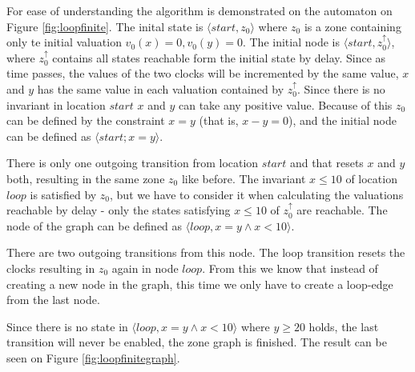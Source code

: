 \begin{example}
	


For ease of understanding the algorithm is demonstrated on the automaton on Figure \ref{fig:loopfinite}. The inital state is  $\langle start, z_0 \rangle$ where $z_0$ is a zone containing only te initial valuation $v_0(x)=0, v_0(y)=0$. The initial node is  $\langle start, z_0^\uparrow  \rangle$, where $z_0^\uparrow$ contains all states reachable form the initial state by delay. Since as time passes, the values of the two clocks will be incremented by the same value, $x$ and $y$ has the same value in each valuation contained by $z_0^\uparrow$. Since there is no invariant in location $start$ $x$ and $y$ can take any positive value. Because of this $z_0$ can be defined by the constraint $x=y$ (that is, $x-y = 0$), and the initial node can be defined as $\langle start; x=y  \rangle$.

There is only one outgoing transition from location $start$ and that resets $x$ and $y$ both, resulting in the same zone $z_0$ like before. The invariant $x \leq 10$ of location $loop$ is satisfied by $z_0$, but we have to consider it when calculating the valuations reachable by delay - only the states satisfying $x \leq 10$ of $z_0^\uparrow$ are reachable. The node of the graph can be defined as $\langle loop, x=y \wedge x<10 \rangle$.

There are two outgoing transitions from this node. The loop transition resets the clocks resulting in $z_0$ again in node $loop$. From this we know that instead of creating a new node in the graph, this time we only have to create a loop-edge from the last node.

Since there is no state in $\langle loop, x=y \wedge x<10 \rangle$ where $y \geq 20$ holds, the last transition will never be enabled, the zone graph is finished.
 The result can be seen on Figure \ref{fig:loopfinitegraph}.

\end{example}


